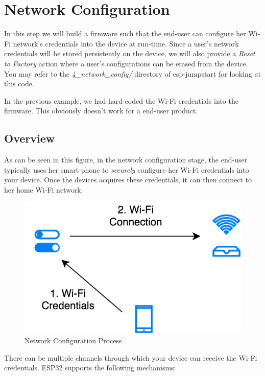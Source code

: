 \documentclass[main.tex]{subfiles}
\begin{document}
\chapter{Network Configuration}

In this step we will build a firmware such that the end-user can configure her Wi-Fi network's credentials into the device at run-time. Since a user's network credentials will be stored persistently on the device, we will also provide a \textit{Reset to Factory} action where a user's configurations can be erased from the device.
You may refer to the \textit{4\_network\_config/} directory of esp-jumpstart for looking at this code.

In the previous example, we had hard-coded the Wi-Fi credentials into the firmware. This obviously doesn't work for a end-user product.

\section{Overview}
As can be seen in this figure, in the network configuration stage, the end-user typically uses her smart-phone to \textit{securely} configure her Wi-Fi credentials into your device. Once the devices acquires these credentials, it can then connect to her home Wi-Fi network. 

\begin{figure}
    \centering
    \includegraphics[scale=0.4]{Pictures/network_config.png}
    \caption{Network Configuration Process}
    \label{fig:network_config}
\end{figure}

There can be multiple channels through which your device can receive the Wi-Fi credentials. ESP32 supports the following mechanisms:
\end{document}
